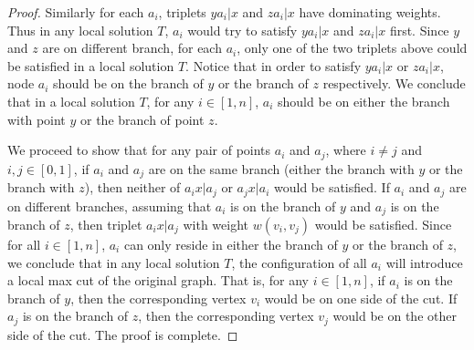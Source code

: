 \documentclass{article}
\theoremstyle{definition}  %
\theoremstyle{plain}
\numberwithin{observation}{section}
\numberwithin{claim}{section}
\numberwithin{fact}{section}
\numberwithin{lemma}{section}
\numberwithin{proposition}{section}
\numberwithin{theorem}{section}
\numberwithin{corollary}{section}
\numberwithin{definition}{section}
\theoremstyle{plain}
\begin{document}
\begin{proof}
    Similarly for each $a_i$, triplets $ya_i|x$ and $za_i|x$ have dominating weights. Thus in any local solution $T$, $a_i$ would try to satisfy $ya_i|x$ and $za_i|x$ first. Since $y$ and $z$ are on different branch, for each $a_i$, only one of the two triplets above could be satisfied in a local solution $T$. Notice that in order to satisfy $ya_i|x$ or $za_i|x$, node $a_i$ should be on the branch of $y$ or the branch of $z$ respectively. We conclude that in a local solution $T$, for any $i \in [1, n]$, $a_i$ should be on either the branch with point $y$ or the branch of point $z$.

    We proceed to show that for any pair of points $a_i$ and $a_j$, where $i \neq j $ and $i, j \in [0, 1]$, if $a_i$ and $a_j$ are on the same branch (either the branch with $y$ or the branch with $z$), then neither of $a_ix|a_j$ or $a_jx|a_i$ would be satisfied. If $a_i$ and $a_j$ are on different branches, assuming that $a_i$ is on the branch of $y$ and $a_j$ is on the branch of $z$, then triplet $a_ix|a_j$ with weight $w(v_i, v_j)$ would be satisfied. Since for all $i \in [1, n]$, $a_i$ can only reside in either the branch of $y$ or the branch of $z$, we conclude that in any local solution $T$, the configuration of all $a_i$ will introduce a local max cut of the original graph. That is, for any $i \in [1, n]$, if $a_i$ is on the branch of $y$, then the corresponding vertex $v_i$ would be on one side of the cut. If $a_j$ is on the branch of $z$, then the corresponding vertex $v_j$ would be on the other side of the cut. The proof is complete.

    
\end{proof}
\fi
\end{document}
